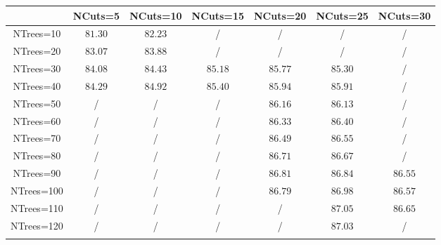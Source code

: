 \centering
\begin{tabular}{ccccccc} \toprule\toprule
 & NCuts=5 & NCuts=10 & NCuts=15 & NCuts=20 & NCuts=25 & NCuts=30\\\midrule
NTrees=10 & $81.30$ & $82.23$ &  / &  / &  / &  /\\
NTrees=20 & $83.07$ & $83.88$ &  / &  / &  / &  /\\
NTrees=30 & $84.08$ & $84.43$ & $85.18$ & $85.77$ & $85.30$ &  /\\
NTrees=40 & $84.29$ & $84.92$ & $85.40$ & $85.94$ & $85.91$ &  /\\
NTrees=50 &  / &  / &  / & $86.16$ & $86.13$ &  /\\
NTrees=60 &  / &  / &  / & $86.33$ & $86.40$ &  /\\
NTrees=70 &  / &  / &  / & $86.49$ & $86.55$ &  /\\
NTrees=80 &  / &  / &  / & $86.71$ & $86.67$ &  /\\
NTrees=90 &  / &  / &  / & $86.81$ & $86.84$ & $86.55$\\
NTrees=100 &  / &  / &  / & $86.79$ & $86.98$ & $86.57$\\
NTrees=110 &  / &  / &  / &  / & $87.05$ & $86.65$\\
NTrees=120 &  / &  / &  / &  / & $87.03$ &  /\\
\bottomrule\bottomrule\\
\end{tabular}

